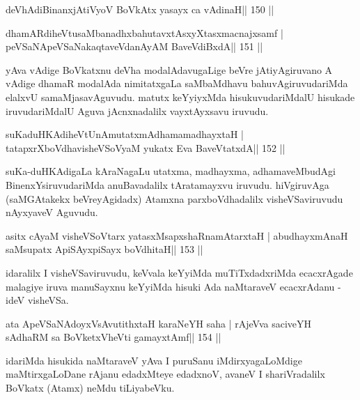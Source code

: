 \begin{shl}
deVhAdiBinanxjAtiVyoV BoVkAtx yasayx ca vAdinaH\hfill || 150 ||
\end{shl}

\begin{shl}
dhamARdiheVtusaMbanadhxbahutavxtAsxyXtasxmacnajxsamf |
peVSaNApeVSaNakaqtaveVdanAyAM BaveVdiBxdA\hfill || 151 ||
\end{shl}

\begin{artha}
yAva vAdige BoVkatxnu deVha modalAdavugaLige beVre jAtiyAgiruvano A  vAdige dhamaR modalAda nimitatxgaLa saMbaMdhavu bahuvAgiruvudariMda  elalxvU samaMjasavAguvudu. matutx keYyiyxMda hisukuvudariMdalU   hisukade iruvudariMdalU Aguva jAcnxnadalilx vayxtAyxsavu iruvudu.
\end{artha}


\begin{shl}
suKaduHKAdiheVtUnAmutatxmAdhamamadhayxtaH |
tatapxrXboVdhavisheVSoV\s yaM yukatx Eva BaveVtatxdA\hfill || 152 ||
\end{shl}

\begin{artha}
suKa-duHKAdigaLa kAraNagaLu utatxma, madhayxma, adhamaveMbudAgi 
BinenxYsiruvudariMda anuBavadalilx tAratamayxvu iruvudu. hiVgiruvAga (saMGAtakekx beVreyAgidadx) Atamxna parxboVdhadalilx visheVSaviruvudu nAyxyaveV Aguvudu.
\end{artha}


\begin{shl}
asitx cAyaM visheVSoV\s tarx yatasxMsapxshaRnamAtarxtaH |
abudhayxmAnaH saMsupatx ApiSAyx\s\s piSayx boVdhitaH\hfill || 153 ||
\end{shl}

\begin{artha}
idaralilx I visheVSaviruvudu, keVvala keYyiMda muTiTxdadxriMda  ecacxrAgade malagiye iruva manuSayxnu keYyiMda hisuki Ada naMtaraveV ecacxrAdanu - ideV visheVSa.
\end{artha}

\begin{shl}
ata ApeVSaNAdoyxV\s sAvutithxtaH karaNeYH saha |
rAjeVva saciveYH sAdhaRM sa BoVketxVheVti gamayxtAmf\hfill || 154 ||
\end{shl}

\begin{artha}
idariMda hisukida naMtaraveV yAva I puruSanu iMdirxyagaLoMdige maMtirxgaLoDane rAjanu edadxMteye edadxnoV, avaneV I shariVradalilx BoVkatx (Atamx) neMdu tiLiyabeVku.
\end{artha}

